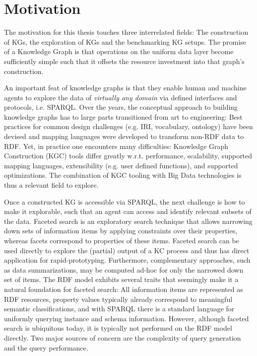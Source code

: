 \section{Motivation}

The motivation for this thesis touches three interrelated fields: The construction of KGs, the exploration of KGs and the benchmarking KG setups.
The promise of a Knowledge Graph is that operations on the uniform data layer become sufficiently simple such that it offsets the resource investment into that graph's construction.

An important feat of knowledge graphs is that they enable human and machine agents to explore the data of \textit{virtually any domain} via defined interfaces and protocols, i.e. SPARQL.
Over the years, the conceptual approach to building knowledge graphs has to large parts transitioned from art to engineering:
Best practices for common design challenges (e.g. IRI, vocabulary, ontology) have been devised and mapping languages were developed to transform non-RDF data to RDF.
Yet, in practice one encounters many difficulties:
Knowledge Graph Construction (KGC) tools differ greatly w.r.t. performance, scalability, supported mapping languages, extensibility (e.g. user defined functions), and supported optimizations.
The combination of KGC tooling with Big Data technologies is thus a relevant field to explore.

Once a constructed KG is accessible via SPARQL, the next challenge is how to make it explorable, such that an agent can access and identify relevant subsets of the data.
Faceted search is an exploratory search technique that allows narrowing down sets of information items by applying constraints over their properties, whereas facets correspond to properties of these items.
Faceted search can be used directly to explore the (partial) output of a KC process and thus has direct application for rapid-prototyping.
Furthermore, complementary approaches, such as data summarizations, may be computed ad-hoc for only the narrowed down set of items.
The RDF model exhibits several traits that seemingly make it a natural foundation for faceted search:
All information items are represented as RDF resources, property values typically already correspond to meaningful semantic classifications, and with SPARQL there is a standard language for uniformly querying instance and schema information.
However, although faceted search is ubiquitous today, it is typically not performed on the RDF model directly. Two major sources of concern are the complexity of query generation and the query performance.

